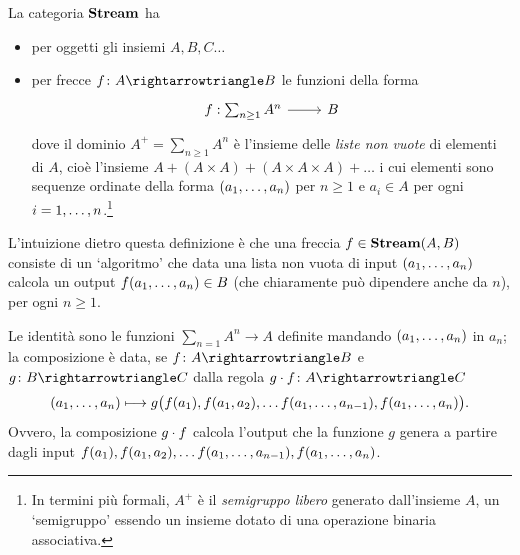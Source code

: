 \begin{example}\label{example_streams}
 La categoria \(\mathbf{Stream}\) ha
 \begin{itemize}
  \item per oggetti gli insiemi \(A,B,C\dots\)
  \item per frecce \(f \colon A\pto B\) le funzioni della forma
        \[\longmor{f : \sum_{n\ge1} A^n}{B}\]
        dove il dominio \(A^+=\sum_{n\ge1} A^n\) è l'insieme delle \emph{liste non vuote} di elementi di \(A\), cioè l'insieme \(A + (A\times A) + (A\times A\times A) + \dots\) i cui elementi sono sequenze ordinate della forma \((\tup an,)\) per \(n\ge 1\) e \(a_i\in A\) per ogni \(i=\iter n\).\footnote{In termini più formali, \(A^+\) è il \emph{semigruppo libero} generato dall'insieme \(A\), un `semigruppo' essendo un insieme dotato di una operazione binaria associativa.}
 \end{itemize}
 L'intuizione dietro questa definizione è che una freccia \(f \in \mathbf{Stream}(A,B)\) consiste di un `algoritmo' che data una lista non vuota di input \((\tup an,)\) calcola un output \(f(\tup an,)\in B\) (che chiaramente può dipendere anche da \(n\)), per ogni \(n\ge 1\).

 Le identità sono le funzioni \(\sum_{n=1} A^n\to A\) definite mandando \((\tup an,)\) in \(a_n\); la composizione è data, se \(f \colon A\pto B\) e \(g \colon B\pto C\) dalla regola \(g\cmp f \colon A\pto C\)
 \[(\tup an,)\longmapsto g\big(f(a_1),f(a_1,a_2),\dots f(\tup a{n-1},),f(\tup an,)\big).\]
 Ovvero, la composizione \(g\cdot f\) calcola l'output che la funzione \(g\) genera a partire dagli input \(f(a_1),f(a_1,a_2),\dots f(\tup a{n-1},),f(\tup an,)\).
\end{example}
